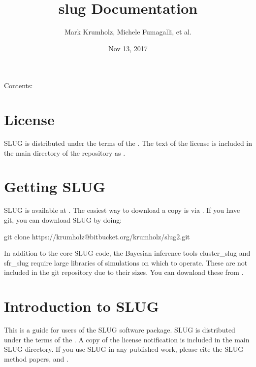 \documentclass[letterpaper,10pt,english]{sphinxmanual}
\title{slug Documentation}
\date{Nov 13, 2017}
\author{Mark Krumholz, Michele Fumagalli, et al.}
\begin{document}
\maketitle
\sphinxtableofcontents
{}\label{\detokenize{index::doc}}


Contents:


\chapter{License}
\label{\detokenize{license::doc}}\label{\detokenize{license:welcome-to-slug-s-documentation}}\label{\detokenize{license:license}}
SLUG is distributed under the terms of the . The text of the license is included in the main directory of the repository as .


\chapter{Getting SLUG}
\label{\detokenize{getting:getting-slug}}\label{\detokenize{getting::doc}}
SLUG is available at . The easiest way to download a copy is via . If you have git, you can download SLUG by doing:

\begin{sphinxVerbatim}[commandchars=\\\{\}]
git clone https://krumholz@bitbucket.org/krumholz/slug2.git
\end{sphinxVerbatim}

In addition to the core SLUG code, the Bayesian inference tools cluster\_slug and sfr\_slug require large libraries of simulations on which to operate. These are not included in the git repository due to their sizes. You can download these from .


\chapter{Introduction to SLUG}
\label{\detokenize{intro:introduction-to-slug}}\label{\detokenize{intro::doc}}
This is a guide for users of the SLUG software package. SLUG is distributed under the terms of the . A copy of the license notification is included in the main SLUG directory. If you use SLUG in any published work, please cite the SLUG method papers,  and .
\end{document}
